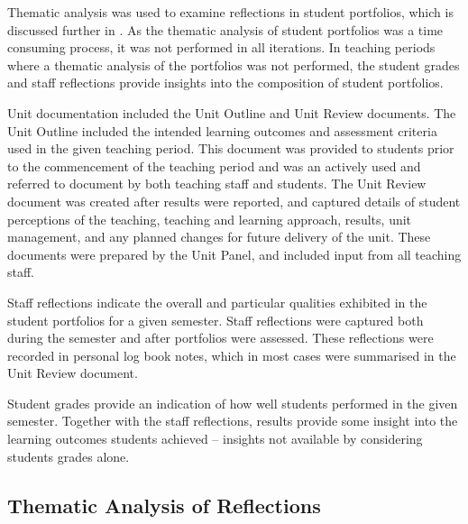 Thematic analysis \cite{Braun:2006} was used to examine reflections in student portfolios, which is discussed further in . As the thematic analysis of student portfolios was a time consuming process, it was not performed in all iterations. In teaching periods where a thematic analysis of the portfolios was not performed, the student grades and staff reflections provide insights into the composition of student portfolios.

Unit documentation included the Unit Outline and Unit Review documents. The Unit Outline included the intended learning outcomes and assessment criteria used in the given teaching period. This document was provided to students prior to the commencement of the teaching period and was an actively used and referred to document by both teaching staff and students. The Unit Review document was created after results were reported, and captured details of student perceptions of the teaching, teaching and learning approach, results, unit management, and any planned changes for future delivery of the unit. These documents were prepared by the Unit Panel, and included input from all teaching staff.


Staff reflections indicate the overall and particular qualities exhibited in the student portfolios for a given semester. Staff reflections were captured both during the semester and after portfolios were assessed. These reflections were recorded in personal log book notes, which in most cases were summarised in the Unit Review document.

Student grades provide an indication of how well students performed in the given semester. Together with the staff reflections, results provide some insight into the learning outcomes students achieved -- insights not available by considering students grades alone.


\subsection{Thematic Analysis of Reflections} %
\label{sub:thematic_analysis}

